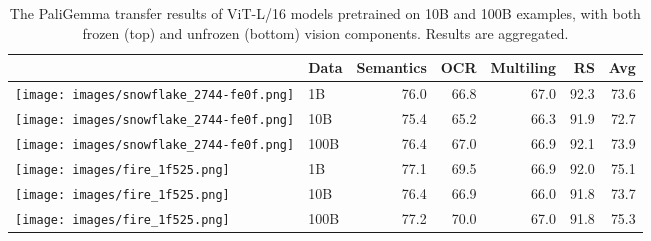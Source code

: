 \begin{table}[h!]
\centering
\footnotesize

\begin{tabular}{p{0pt}l|rrrrr}
\toprule
& Data & Semantics & OCR & Multiling & RS & Avg \\
\midrule
\texttt{[image: images/snowflake\_2744-fe0f.png]} & 1B & 76.0 & 66.8 & 67.0 & 92.3 & 73.6 \\
\texttt{[image: images/snowflake\_2744-fe0f.png]} & 10B & 75.4 & 65.2 & 66.3 & 91.9 & 72.7 \\
\texttt{[image: images/snowflake\_2744-fe0f.png]} & 100B & 76.4 & 67.0 & 66.9 & 92.1 & 73.9 \\
\texttt{[image: images/fire\_1f525.png]} & 1B & 77.1 & 69.5 & 66.9 & 92.0 & 75.1 \\
\texttt{[image: images/fire\_1f525.png]} & 10B & 76.4 & 66.9 & 66.0 & 91.8 & 73.7 \\
\texttt{[image: images/fire\_1f525.png]} & 100B & {77.2} & {70.0} & {67.0} & {91.8} & {75.3} \\
\bottomrule
\end{tabular}

\caption{
The PaliGemma transfer results of ViT-L/16 models pretrained on 10B and 100B examples, with both frozen (top) %
and unfrozen (bottom) %
vision components. Results are aggregated.
}
\label{tab:transfer_avg}
\end{table}
